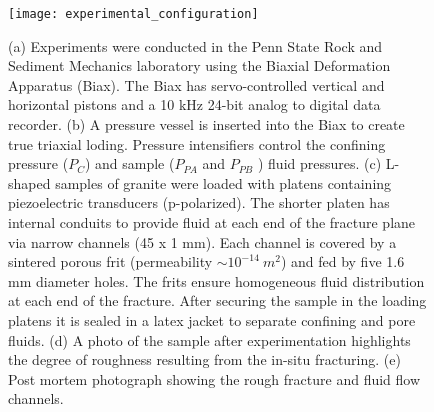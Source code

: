 \documentclass[draft]{agujournal2019}
\begin{document}
\newpage

\begin{figure}[ht]
	\centering
	\texttt{[image: experimental\_configuration]}
	\caption[]{(a) Experiments were conducted in the Penn State Rock and Sediment Mechanics laboratory using the Biaxial Deformation Apparatus (Biax). The Biax has servo-controlled vertical and horizontal pistons and a 10 kHz 24-bit analog to digital data recorder. (b) A pressure vessel is inserted into the Biax to create true triaxial loding. Pressure intensifiers control the confining pressure ($P_C$) and sample ($P_{PA}$ and $P_{PB}$ ) fluid pressures. (c) L-shaped samples of granite were loaded with platens containing piezoelectric transducers (p-polarized). The shorter platen has internal conduits to provide fluid at each end of the fracture plane via narrow channels (45 x 1 mm). Each channel is covered by a sintered porous frit (permeability $\sim 10^{-14}\ m^2$) and fed by five 1.6 mm diameter holes. The frits ensure homogeneous fluid distribution at each end of the fracture. After securing the sample in the loading platens it is sealed in a latex jacket to separate confining and pore fluids. (d) A photo of the sample after experimentation highlights the degree of roughness resulting from the in-situ fracturing. (e) Post mortem photograph showing the rough fracture and fluid flow channels. }
	\label{fig:samplesetup}
\end{figure}

\newpage
\end{document}
